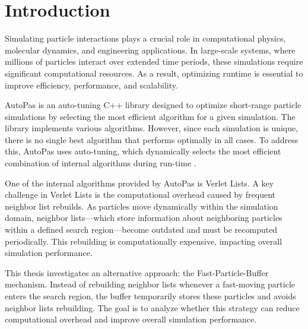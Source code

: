 \chapter{Introduction}\label{chapter:introduction}



Simulating particle interactions plays a crucial role in computational physics, molecular dynamics, and engineering applications. In large-scale systems, where millions of particles interact over extended time periods, these simulations require significant computational resources. As a result, optimizing runtime is essential to improve efficiency, performance, and scalability. \parencite{aktulga2012parallel}


AutoPas is an auto-tuning C++ library designed to optimize short-range particle simulations by selecting the most efficient algorithm for a given simulation. The library implements various algorithms. However, since each simulation is unique, there is no single best algorithm that performs optimally in all cases. To address this, AutoPas uses auto-tuning, which dynamically selects the most efficient combination of internal algorithms during run-time \parencite{seckler2021autopas}.

One of the internal algorithms provided by AutoPas is Verlet Lists. A key challenge in Verlet Lists is the computational overhead caused by frequent neighbor list rebuilds. As particles move dynamically within the simulation domain, neighbor lists—which store information about neighboring particles within a defined search region—become outdated and must be recomputed periodically. This rebuilding is computationally expensive, impacting overall simulation performance.

This thesis investigates an alternative approach: the Fast-Particle-Buffer mechanism. Instead of rebuilding neighbor lists whenever a fast-moving particle enters the search region, the buffer temporarily stores these particles and avoids neighbor lists rebuilding. The goal is to analyze whether this strategy can reduce computational overhead and improve overall simulation performance.


